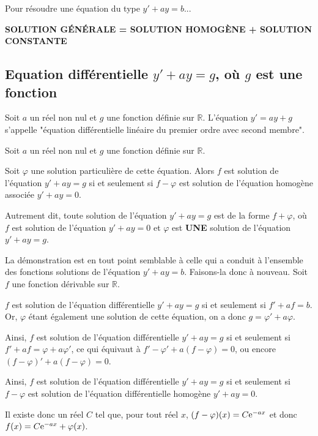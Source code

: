 \documentclass[11pt,fleqn, openany]{book} %
\begin{document}
\begin{proposition} Pour résoudre une équation du type $y'+ay=b$...
\begin{center}
\textbf{SOLUTION GÉNÉRALE = SOLUTION HOMOGÈNE + SOLUTION CONSTANTE}
\end{center}\vspace{-0.5cm}\end{proposition}


\subsection{Equation différentielle $y'+ay=g$, où $g$ est une fonction}

\begin{definition}Soit $a$ un réel non nul et $g$ une fonction définie sur $\mathbb{R}$. L'équation $y'=ay+g$ s'appelle "équation différentielle linéaire du premier ordre avec second membre".\end{definition}

\begin{proposition}Soit $a$ un réel non nul et $g$ une fonction définie sur $\mathbb{R}$. 

Soit $\varphi$ une solution particulière de cette équation. Alors $f$ est solution de l'équation $y'+ay=g$ si et seulement si $f-\varphi$ est solution de l'équation homogène associée $y'+ay=0$.

Autrement dit, toute solution de l'équation $y'+ay=g$ est de la forme $f+\varphi$, où $f$ est solution de l'équation $y'+ay=0$ et $\varphi$ est \textbf{UNE} solution de l'équation $y'+ay=g$.\end{proposition}

\begin{demonstration}La démonstration est en tout point semblable à celle qui a conduit à l'ensemble des fonctions solutions de l'équation $y'+ay=b$. Faisons-la donc à nouveau. Soit $f$ une fonction dérivable sur $\mathbb{R}$.

$f$ est solution de l'équation différentielle $y'+ay=g$ si et seulement si $f'+af=b$. Or, $\varphi$ étant également une solution de cette équation, on a donc $g=\varphi'+a\varphi$.

Ainsi, $f$ est solution de l'équation différentielle $y'+ay=g$ si et seulement si $f'+af=\varphi+a\varphi '$, ce qui équivaut à $f'-\varphi'+a(f-\varphi)=0$, ou encore $(f-\varphi)'+a(f-\varphi)=0$.

Ainsi, $f$ est solution de l'équation différentielle $y'+ay=g$ si et seulement si $f-\varphi$ est solution de l'équation différentielle homogène $y'+ay=0$.

Il existe donc un réel $C$ tel que, pour tout réel $x$, $(f-\varphi)(x)=C\mathrm{e}^{-ax}$ et donc $f(x)=C\mathrm{e}^{-ax}+\varphi(x)$.\end{demonstration}
\end{document}
